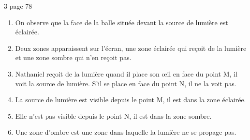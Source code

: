 \begin{myact}{3 page 78}
	\begin{enumerate}
		\item On observe que la face de la balle située devant la source de lumière est éclairée.\pause
		\item Deux zones apparaissent sur l'écran, une zone éclairée qui reçoit de la lumière et une zone sombre qui n'en reçoit pas.\pause
		\item Nathaniel reçoit de la lumière quand il place son \oe il en face du point M, il voit la source de lumière. S'il se place en face du point N, il ne la voit pas.\pause
		\item La source de lumière est visible depuis le point M, il est dans la zone éclairée.\pause
		\item Elle n'est pas visible depuis le point N, il est dans la zone sombre.\pause
		\item Une zone d'ombre est une zone dans laquelle la lumière ne se propage pas.
	\end{enumerate}
\end{myact}